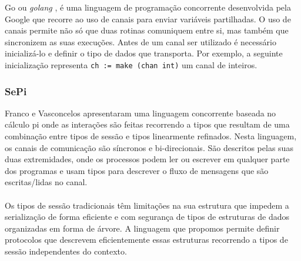 Go ou \textit{golang} \cite{ref-go}, é uma linguagem de programação concorrente desenvolvida pela Google que recorre ao uso de canais para enviar variáveis partilhadas. O uso de canais permite não só que duas rotinas comuniquem entre si, mas também que sincronizem as suas execuções. Antes de um canal ser utilizado é necessário inicializá-lo e definir o tipo de dados que transporta. Por exemplo, a seguinte inicialização representa \lstinline"ch := make (chan int)" um canal de inteiros.

\subsubsection{SePi}
\label{sec:sepi}
\lstset{language=Sepi}
Franco e Vasconcelos \cite{ref-sepi} apresentaram uma linguagem concorrente baseada no cálculo pi onde as interações são feitas recorrendo a tipos que resultam de uma combinação entre tipos de sessão e tipos linearmente refinados.
Nesta linguagem, os canais de comunicação são síncronos e bi-direcionais. São descritos pelas suas duas extremidades, onde os processos podem ler ou escrever em qualquer parte dos programas e usam tipos para descrever o fluxo de mensagens que são escritas/lidas no canal.

\paragraph{}Os tipos de sessão tradicionais têm limitações na sua estrutura que impedem a serialização de forma eficiente e com segurança de tipos de estruturas de dados organizadas em forma de árvore. A linguagem que propomos permite definir protocolos que descrevem eficientemente essas estruturas recorrendo a tipos de sessão independentes do contexto.


